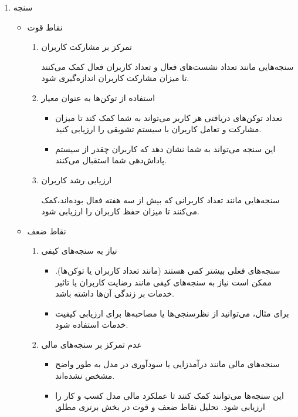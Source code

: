 \documentclass[dvipsnames, svgnames, x11names, 11pt]{article}
\begin{document}
\begin{enumerate}
\item 
سنجه 
\begin{itemize}
\item 
نقاط قوت
\begin{enumerate}
\item 
تمرکز بر مشارکت کاربران

سنجه‌هایی مانند تعداد نشست‌های فعال و تعداد کاربران فعال کمک می‌کنند تا میزان مشارکت کاربران اندازه‌گیری شود.

\item 
استفاده از توکن‌ها به عنوان معیار
\begin{itemize}
\item 
تعداد توکن‌های دریافتی هر کاربر می‌تواند به شما کمک کند تا میزان مشارکت و تعامل کاربران با سیستم تشویقی را ارزیابی کنید.
\item 
این سنجه می‌تواند به شما نشان دهد که کاربران چقدر از سیستم پاداش‌دهی شما استقبال می‌کنند.

\end{itemize}

\item 
ارزیابی رشد کاربران

سنجه‌هایی مانند تعداد کاربرانی که بیش از سه هفته فعال بوده‌اند،کمک می‌کنند تا میزان حفظ کاربران را ارزیابی شود.
\end{enumerate}

\item 
نقاط ضعف
\begin{enumerate}
\item 
نیاز به سنجه‌های کیفی
\begin{itemize}
\item 
سنجه‌های فعلی بیشتر کمی هستند (مانند تعداد کاربران یا توکن‌ها). ممکن است نیاز به سنجه‌های کیفی مانند رضایت کاربران یا تاثیر خدمات بر زندگی آن‌ها داشته باشد.
\item 
برای مثال، می‌توانید از نظرسنجی‌ها یا مصاحبه‌ها برای ارزیابی کیفیت خدمات استفاده شود.
\end{itemize}

\item 
عدم تمرکز بر سنجه‌های مالی
\begin{itemize}
\item 
سنجه‌های مالی مانند درآمدزایی یا سودآوری در مدل به طور واضح مشخص نشده‌اند.
\item 
این سنجه‌ها می‌توانند کمک کنند تا عملکرد مالی مدل کسب و کار را ارزیابی شود.
 تحلیل نقاط ضعف و قوت در بخش برتری مطلق 
\end{itemize}
\end{enumerate}
\end{itemize}


\end{enumerate}
\end{document}
